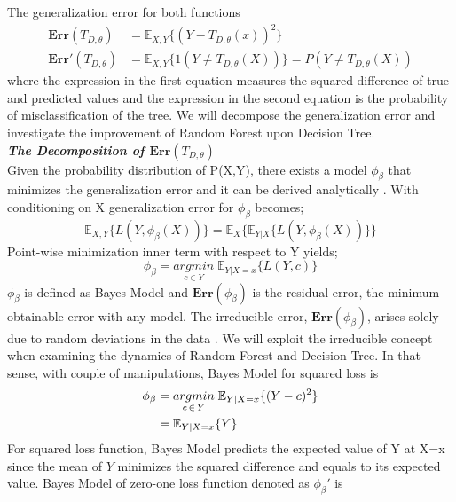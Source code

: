 The generalization error for both functions 
\begin{align}
	\boldsymbol{Err}(T_{D,\theta}) & = \mathbb{E}_{X,Y}\{ (Y - T_{D, \theta}(x))^2 \} \\
	\boldsymbol{Err'}(T_{D,\theta}) & = \mathbb{E}_{X,Y}\{ 1(Y \neq T_{D, \theta}(X)) \}
	= P(Y \neq T_{D, \theta}(X))
\end{align}
where the expression in the first equation measures the squared difference of true and predicted values
and the expression in the second equation is the probability of misclassification of the tree. 
We will decompose the generalization error and investigate the improvement of Random Forest upon 
Decision Tree.
\vspace{2mm}
\\
\textbf{\emph{The Decomposition of $\boldsymbol{Err}(T_{D,\theta})$}}\\
Given the probability distribution of P(X,Y), 
there exists a model $\phi_{\beta}$ that minimizes the generalization error 
and it can be derived analytically \cite{louppe2014understanding}. 
With conditioning on X generalization error for $\phi_{\beta}$ becomes;
\begin{equation}
\mathbb{E}_{X,Y} \{L(Y, \phi_{\beta}(X))\} = \mathbb{E}_{X}\{\mathbb{E}_{Y|X}\{L(Y, \phi_{\beta}(X)) \} \}
\end{equation}
Point-wise minimization inner term  with respect to Y yields;
\begin{equation}
\phi_{\beta} = \underset{c \in Y}{argmin} \; \mathbb{E}_{Y|X=x}\{L(Y,c)\}
\end{equation}
$\phi_{\beta}$ is defined as Bayes Model and $\boldsymbol{Err}(\phi_{\beta})$ is the residual error, 
the minimum obtainable error with any model. 
The irreducible error, $\boldsymbol{Err}(\phi_{\beta})$, arises solely 
due to random deviations in the data \cite{louppe2014understanding}. 
We will exploit the irreducible concept when examining the dynamics of Random Forest and 
Decision Tree. In that sense, with couple of manipulations, Bayes Model for squared loss is
\begin{align}
\phi_{\beta} & = \underset{c \,\in\, Y}{argmin} \; \mathbb{E}_{Y|X=x}\{(Y-c)^2 \} \notag\\
			 & = \mathbb{E}_{Y|X=x}\{Y\}
\end{align}
For squared loss function, Bayes Model predicts the expected value of Y at X=x 
since the mean of $Y$ minimizes the squared difference 
and equals to its expected value.
Bayes Model of zero-one loss function denoted as $\phi_{\beta}'$ is
